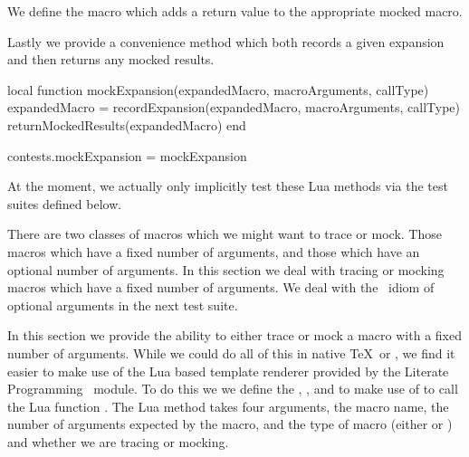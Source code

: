 We define the \type{\addMockResult} macro which adds a return 
value to the appropriate mocked macro. 

\startMkIVCode
\def\addMockResult#1#2{%
  \directlua{%
    thirddata.contests.addMockResult('#1', '#2')
  }
}
\stopMkIVCode

Lastly we provide a convenience method which both records a given 
expansion and then returns any mocked results. 

\startLuaCode
local function mockExpansion(expandedMacro,
                               macroArguments,
                               callType)
  expandedMacro = recordExpansion(expandedMacro,
                               macroArguments,
                               callType)
  returnMockedResults(expandedMacro)
end

contests.mockExpansion = mockExpansion
\stopLuaCode

At the moment, we actually only implicitly test these Lua methods via the 
test suites defined below. 

\stopTestSuite


There are two classes of macros which we might want to trace or mock. 
Those macros which have a fixed number of arguments, and those which have 
an optional number of arguments. In this section we deal with tracing or 
mocking macros which have a fixed number of arguments. We deal with the 
\ConTeXt\ idiom of optional arguments in the next test suite. 

In this section we provide the ability to either trace or mock a macro 
with a fixed number of arguments. While we could do all of this in native 
\TeX\ or \ConTeXt, we find it easier to make use of the Lua based template 
renderer provided by the Literate Programming \ConTeXt\ module. To do this 
we we define the \type{\traceTexMacro}, \type{\traceContextMacro}, 
\type{\mockTexMacro} and \type{\mockContextMacro} to make use of 
\type{\directlua} to call the Lua function . The Lua 
 method takes four arguments, the macro name, the 
number of arguments expected by the macro, and the type of macro (either 
 or ) and whether we are tracing or mocking. 

\startMkIVCode
\def\traceTexMacro#1#2{%
  \directlua{%
    thirddata.contests.createMacro('#1', #2, 'tex', 'trace')
  }
}

\def\traceContextMacro#1#2{%
  \directlua{%
    thirddata.contests.createMacro('#1', #2, 'context', 'trace')
  }
}

